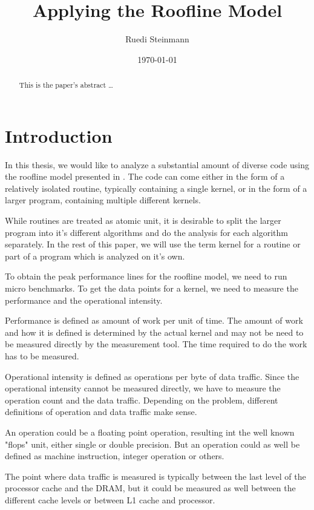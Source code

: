 \documentclass[a4paper,12pt]{article}
\title{Applying the Roofline Model}
\author{Ruedi Steinmann}
\date{\today}
\begin{document}
\maketitle

\begin{abstract}
This is the paper's abstract \ldots
\end{abstract}

\tableofcontents

\section{Introduction}
In this thesis, we would like to analyze a substantial amount of diverse code using the roofline model presented in \cite{Roofline}. The code can come either in the form of a relatively isolated routine, typically containing a single kernel, or in the form of a larger program, containing multiple different kernels.

While routines are treated as atomic unit, it is desirable to split the larger program into it's different algorithms and do the analysis for each algorithm separately. In the rest of this paper, we will use the term kernel for a routine or part of a program which is analyzed on it's own.

To obtain the peak performance lines for the roofline model, we need to run micro benchmarks. To get the data points for a kernel, we need to measure the performance and the operational intensity. 

Performance is defined as amount of work per unit of time. The amount of work and how it is defined is determined by the actual kernel and may not be need to be measured directly by the measurement tool. The time required to do the work has to be measured.

Operational intensity is defined as operations per byte of data traffic. Since the operational intensity cannot be measured directly, we have to measure the operation count and the data traffic. Depending on the problem, different definitions of operation and data traffic make sense.

An operation could be a floating point operation, resulting int the well known "flops" unit, either single or double precision. But an operation could as well be defined as machine instruction, integer operation or others.

The point where data traffic is measured is typically between the last level of the processor cache and the DRAM, but it could be measured as well between the different cache levels or between L1 cache and processor.
\end{document}
